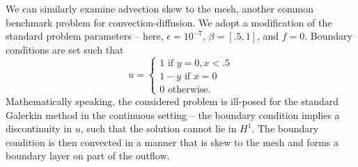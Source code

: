 \documentclass[final,leqno]{siamltex}
\begin{document}
We can similarly examine advection skew to the mesh, another common benchmark problem for convection-diffusion.  We adopt a modification of the standard problem parameters -- here, $\epsilon = 10^{-7}$, $\beta = [.5,1]$, and $f=0$.  Boundary conditions are set such that
\[
u = \begin{cases}
1 \text{ if } y = 0, x< .5\\
1-y \text{ if } x = 0\\
0 \text{ otherwise}.
\end{cases}
\]
Mathematically speaking, the considered problem is ill-posed for the standard Galerkin method in the continuous setting -- the boundary condition implies a discontinuity in $u$, such that the solution cannot lie in $H^1$.  The boundary condition is then convected in a manner that is skew to the mesh and forms a boundary layer on part of the outflow.
\end{document}
